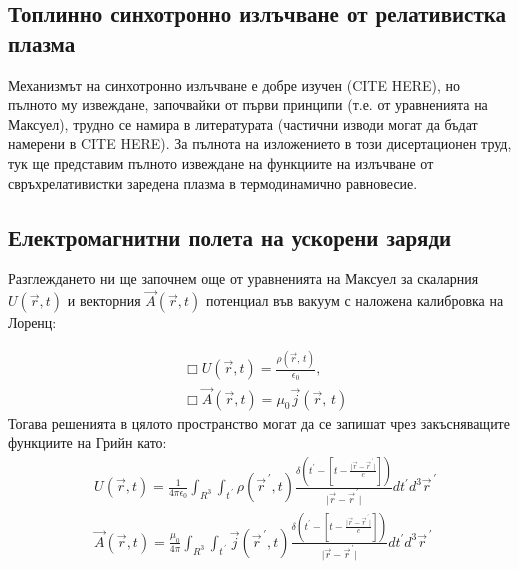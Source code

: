 \appendixpage
\begin{appendices}
	\lfoot{}
	\section{Топлинно синхотронно излъчване от релативистка плазма}
	
	Механизмът на синхотронно излъчване е добре изучен (CITE HERE), но пълното му извеждане, започвайки от първи принципи (т.е. от уравненията на Максуел), трудно се намира в литературата (частични изводи могат да бъдат намерени в CITE HERE). За пълнота на изложението в този дисертационен труд, тук ще представим пълното извеждане на функциите на излъчване от свръхрелативистки заредена плазма в термодинамично равновесие.
	
	\subsection{Електромагнитни полета на ускорени заряди}
	
	Разглеждането ни ще започнем още от уравненията на Максуел за скаларния $U\left(\vec{r},t\right)$ и векторния $\vec{A}\left(\vec{r},t\right)$ потенциал във вакуум с наложена калибровка на Лоренц:
	
	\begin{equation}
		\begin{split}
		&\Box U\left(\vec{r},t\right) = \frac{\rho(\vec{r},\,t)}{\epsilon_0},\\
	    &\Box \vec{A}\left(\vec{r},t\right) = \mu_0\vec{j}(\vec{r},\,t)
		\end{split}
	\end{equation}
	Тогава решенията в цялото пространство могат да се запишат чрез закъсняващите функциите на Грийн като:
	\begin{equation}
		\begin{split}
			&U\left(\vec{r},t\right) = \frac{1}{4\pi\epsilon_0}\int_{R^3}\int_{t^{\,\prime}} \rho(\vec{r}^{\,\prime},t)\frac{\delta\left(t^\prime - \left[t - \frac{\vert \vec{r} - \vec{r}^{\,\prime}\vert}{c}\right]\right)}{\vert \vec{r} - \vec{r}^{\,\prime}\vert}dt^\prime d^3\vec{r}^{\,\prime}\\
			&\vec{A}\left(\vec{r},t\right) = \frac{\mu_0}{4\pi}\int_{R^3}\int_{t^{\,\prime}} \vec{j}(\vec{r}^{\,\prime},t)\frac{\delta\left(t^\prime - \left[t - \frac{\vert \vec{r} - \vec{r}^{\,\prime}\vert}{c}\right]\right)}{\vert \vec{r} - \vec{r}^{\,\prime}\vert}dt^\prime		d^3\vec{r}^{\,\prime} 
		\end{split}
	\end{equation} 
	

\end{appendices}
